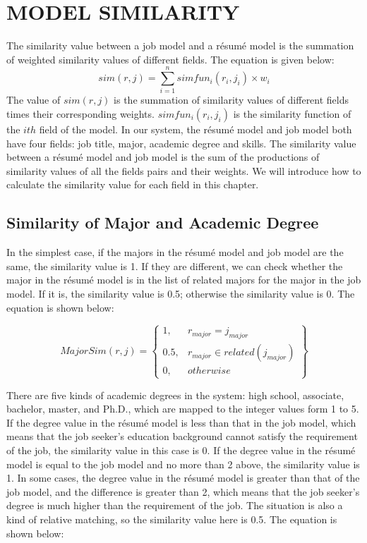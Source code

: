 \chapter{MODEL SIMILARITY}
The similarity value between a  job model and a r\'esum\'e model is the summation of weighted similarity values of different fields. The equation is given below:
$$ sim(r, j) = \sum_{i=1}^{n} simfun_i(r_i,j_i) \times w_i $$
The value of $sim(r, j)$ is the summation of similarity values of different fields times their corresponding weights. $simfun_i(r_i,j_i)$ is the similarity function of the $ith$ field of the model. In our system, the r\'esum\'e model and job model both have four fields: job title, major, academic degree and skills. The similarity value between a r\'esum\'e model and job model is the sum of the productions of similarity values of all the fields pairs and their weights. We will introduce how to calculate the similarity value for each field in this chapter.

\section{Similarity of Major and Academic Degree}

In the simplest case, if the majors in the r\'esum\'e model and job model are the same, the similarity value is 1. If they are different, we can check whether the major in the r\'esum\'e model is in the list of related majors for the major in the job model. If it is, the similarity value is 0.5; otherwise the similarity value is 0. The equation is shown below:

$$ MajorSim(r,j ) = \begin{Bmatrix}
1, & r_{major} = j_{major} \\
0.5, & r_{major} \in related( j_{major} ) \\
0, & otherwise
\end{Bmatrix} $$

There are five kinds of academic degrees in the system:  high school, associate, bachelor, master, and Ph.D., which are mapped to the integer values form 1 to 5. If the degree value in the r\'esum\'e model is less than that in the job model, which means that the job seeker's education background cannot satisfy the requirement of the job, the similarity value in this case is 0. If the degree value in the r\'esum\'e model is equal to the job model and no more than 2 above, the similarity value is 1. In some cases, the degree value in the r\'esum\'e model is greater than that of the job model, and the difference is greater than 2, which means that the job seeker's degree is much higher than the requirement of the job. The situation is also a kind of relative matching, so the similarity value here is 0.5. The equation is shown below:

